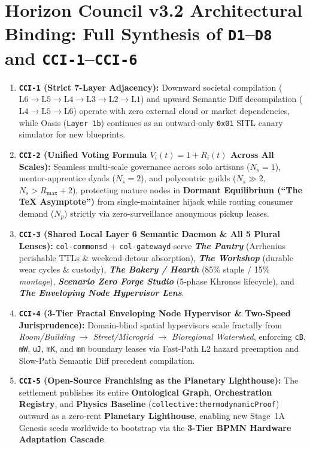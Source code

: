 \section{Horizon Council v3.2 Architectural Binding: Full Synthesis of \texttt{D1}--\texttt{D8} and \texttt{CCI-1}--\texttt{CCI-6}}
\begin{enumerate}
    \item \textbf{\texttt{CCI-1} (Strict 7-Layer Adjacency):} Downward societal compilation ($\mathrm{L6} \to \mathrm{L5} \to \mathrm{L4} \to \mathrm{L3} \to \mathrm{L2} \to \mathrm{L1}$) and upward Semantic Diff decompilation ($\mathrm{L4} \to \mathrm{L5} \to \mathrm{L6}$) operate with zero external cloud or market dependencies, while Oasis (\texttt{Layer~1b}) continues as an outward-only \texttt{0x01} SITL canary simulator for new blueprints.
    \item \textbf{\texttt{CCI-2} (Unified Voting Formula $V_i(t) = 1 + R_i(t)$ Across All Scales):} Seamless multi-scale governance across solo artisans ($N_s = 1$), mentor-apprentice dyads ($N_s = 2$), and polycentric guilds ($N_s \gg 2$, $N_s > R_{\max} + 2$), protecting mature nodes in \textbf{Dormant Equilibrium (``The \TeX{} Asymptote'')} from single-maintainer hijack while routing consumer demand ($N_p$) strictly via zero-surveillance anonymous pickup leases.
    \item \textbf{\texttt{CCI-3} (Shared Local Layer 6 Semantic Daemon \& All 5 Plural Lenses):} \texttt{col-commonsd} + \texttt{col-gatewayd} serve \textbf{\textit{The Pantry}} (Arrhenius perishable TTLs \& weekend-detour absorption), \textbf{\textit{The Workshop}} (durable wear cycles \& custody), \textbf{\textit{The Bakery / Hearth}} (85\% staple / 15\% \textit{montage}), \textbf{\textit{Scenario Zero Forge Studio}} (5-phase Khronos lifecycle), and \textbf{\textit{The Enveloping Node Hypervisor Lens}}.
    \item \textbf{\texttt{CCI-4} (3-Tier Fractal Enveloping Node Hypervisor \& Two-Speed Jurisprudence):} Domain-blind spatial hypervisors scale fractally from \textit{Room/Building} $\to$ \textit{Street/Microgrid} $\to$ \textit{Bioregional Watershed}, enforcing \texttt{cB}, \texttt{mW}, \texttt{uJ}, \texttt{mK}, and \texttt{mm} boundary leases via Fast-Path L2 hazard preemption and Slow-Path Semantic Diff precedent compilation.
    \item \textbf{\texttt{CCI-5} (Open-Source Franchising as the Planetary Lighthouse):} The settlement publishes its entire \textbf{Ontological Graph}, \textbf{Orchestration Registry}, and \textbf{Physics Baseline} (\texttt{collective:thermodynamicProof}) outward as a zero-rent \textbf{Planetary Lighthouse}, enabling new Stage~1A Genesis seeds worldwide to bootstrap via the \textbf{3-Tier BPMN Hardware Adaptation Cascade}.

\end{enumerate}
